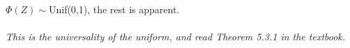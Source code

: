

\setcounter{theorem}{30}
\begin{exercise}[BH.5.31] 
\begin{solution}
    $\Phi(Z)\sim$Unif(0,1), the rest is apparent.\\~\\
	\textit{This is the universality of the uniform, and read Theorem 5.3.1 in the textbook.}
\end{solution}
\end{exercise}


